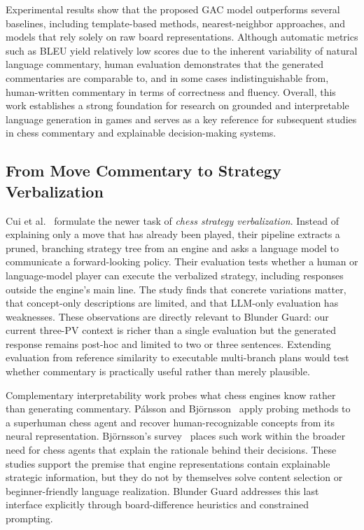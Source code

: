 \documentclass[sigconf,nonacm]{acmart}
\begin{document}
Experimental results show that the proposed GAC model outperforms several baselines, including template-based methods, nearest-neighbor approaches, and models that rely solely on raw board representations. Although automatic metrics such as BLEU yield relatively low scores due to the inherent variability of natural language commentary, human evaluation demonstrates that the generated commentaries are comparable to, and in some cases indistinguishable from, human-written commentary in terms of correctness and fluency. Overall, this work establishes a strong foundation for research on grounded and interpretable language generation in games and serves as a key reference for subsequent studies in chess commentary and explainable decision-making systems.

\subsection{From Move Commentary to Strategy Verbalization}

Cui et al.~\cite{cui2026strategies} formulate the newer task of \emph{chess strategy verbalization}. Instead of explaining only a move that has already been played, their pipeline extracts a pruned, branching strategy tree from an engine and asks a language model to communicate a forward-looking policy. Their evaluation tests whether a human or language-model player can execute the verbalized strategy, including responses outside the engine's main line. The study finds that concrete variations matter, that concept-only descriptions are limited, and that LLM-only evaluation has weaknesses. These observations are directly relevant to Blunder Guard: our current three-PV context is richer than a single evaluation but the generated response remains post-hoc and limited to two or three sentences. Extending evaluation from reference similarity to executable multi-branch plans would test whether commentary is practically useful rather than merely plausible.

Complementary interpretability work probes what chess engines know rather than generating commentary. P\'alsson and Bj\"ornsson~\cite{palsson2023concepts} apply probing methods to a superhuman chess agent and recover human-recognizable concepts from its neural representation. Bj\"ornsson's survey~\cite{bjornsson2024chessxai} places such work within the broader need for chess agents that explain the rationale behind their decisions. These studies support the premise that engine representations contain explainable strategic information, but they do not by themselves solve content selection or beginner-friendly language realization. Blunder Guard addresses this last interface explicitly through board-difference heuristics and constrained prompting.
\end{document}
